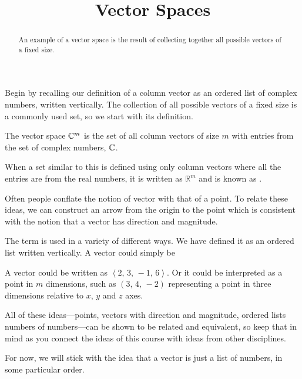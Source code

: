 \documentclass{ximera}
\title{Vector Spaces}
\begin{document}
\begin{abstract}
  An example of a vector space is the result of collecting together
  all possible vectors of a fixed size.
\end{abstract}
\maketitle

Begin by recalling our definition of a column vector as an ordered
list of complex numbers, written vertically.  The collection of all
possible vectors of a fixed size is a commonly used set, so we start
with its definition.

\begin{definition}
  The vector space $\mathbb{C}^{m}$ is the set of all column vectors of
  size $m$ with entries from the set of complex numbers, $\mathbb{C}$.

  When a set similar to this is defined using only column vectors
  where all the entries are from the real numbers, it is written as
  ${\mathbb R}^m$ and is known as .
\end{definition}

\begin{warning}
  Often people conflate the notion of vector with that of a point.  To
  relate these ideas, we can construct an arrow from the origin to the
  point which is consistent with the notion that a vector has
  direction and magnitude.
\end{warning}

\begin{question}
  The term  is used in a variety of different ways.  We
  have defined it as an ordered list written vertically.  A vector
  could simply be
  \begin{multipleChoice}
  \end{multipleChoice}

  \begin{feedback}[correct]
    A vector could be written as
    $\left\langle 2,\,3,\,-1,\,6\right\rangle$.  Or it could be
    interpreted as a point in $m$ dimensions, such as
    $\left(3,\,4,\,-2\right)$ representing a point in three dimensions
    relative to $x$, $y$ and $z$ axes.

    All of these ideas---points, vectors with direction and magnitude,
    ordered lists numbers of numbers---can be shown to be related and
    equivalent, so keep that in mind as you connect the ideas of this
    course with ideas from other disciplines.

    For now, we will stick with the idea that a vector is just a list
    of numbers, in some particular order.
  \end{feedback}
\end{question}
\end{document}
